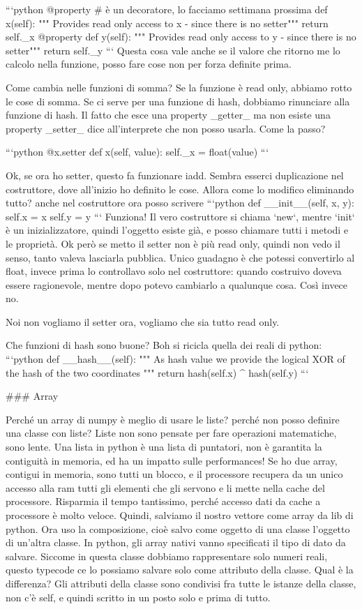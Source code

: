 \documentclass[10pt, a4paper, twosided, titlepage, draft]{book}
\begin{document}
```python
@property # è un decoratore, lo facciamo settimana prossima
def x(self):
""" Provides read only access to x - since there is no setter"""
return self._x
@property
def y(self):
""" Provides read only access to y - since there is no setter"""
return self._y 
```
Questa cosa vale anche se il valore che ritorno me lo calcolo nella funzione, posso fare cose non per forza definite prima.

Come cambia nelle funzioni di somma?
Se la funzione è read only, abbiamo rotto le cose di somma. Se ci serve per una funzione di hash, dobbiamo rinunciare alla funzione di hash.
Il fatto che esce una property _getter_ ma non esiste una property _setter_ dice all'interprete che non posso usarla. Come la passo?

```python
@x.setter
def x(self, value):
self._x = float(value)
```

Ok, se ora ho setter, questo fa funzionare iadd. Sembra esserci duplicazione nel costruttore, dove all'inizio ho definito le cose. Allora come lo modifico eliminando tutto? anche nel costruttore ora posso scrivere
```python
def __init__(self, x, y):
self.x = x
self.y = y
```
Funziona!
Il vero costruttore si chiama `new`, mentre `init` è un inizializzatore, quindi l'oggetto esiste già, e posso chiamare tutti i metodi e le proprietà.
Ok però se metto il setter non è più read only, quindi non vedo il senso, tanto valeva lasciarla pubblica. Unico guadagno è che potessi convertirlo al float, invece prima lo controllavo solo nel costruttore: quando costruivo doveva essere ragionevole, mentre dopo potevo cambiarlo a qualunque cosa. 
Così invece no.

Noi non vogliamo il setter ora, vogliamo che sia tutto read only.

Che funzioni di hash sono buone? Boh si ricicla quella dei reali di python:
```python
def __hash__(self):
""" As hash value we provide the logical XOR of the hash of 
the two coordinates """
return hash(self.x) ^ hash(self.y)
```

### Array

Perché un array di numpy è meglio di usare le liste? perché non posso definire una classe con liste? Liste non sono pensate per fare operazioni matematiche, sono lente.
Una lista in python è una lista di puntatori, non è garantita la contiguità in memoria, ed ha un impatto sulle performances!
Se ho due array, contigui in memoria, sono tutti un blocco, e il processore recupera da un unico accesso alla ram tutti gli elementi che gli servono e li mette nella cache del processore.
Risparmia il tempo tantissimo, perché accesso dati da cache a processore è molto veloce.
Quindi, salviamo il nostro vettore come array da lib di python. 
Ora uso la composizione, cioè salvo come oggetto di una classe l'oggetto di un'altra classe.
In python, gli array nativi vanno specificati il tipo di dato da salvare.
Siccome in questa classe dobbiamo rappresentare solo numeri reali, questo typecode ce lo possiamo salvare solo come attributo della classe.
Qual è la differenza? 
Gli attributi della classe sono condivisi fra tutte le istanze della classe, non c'è self, e quindi scritto in un posto solo e prima di tutto.
\end{document}
